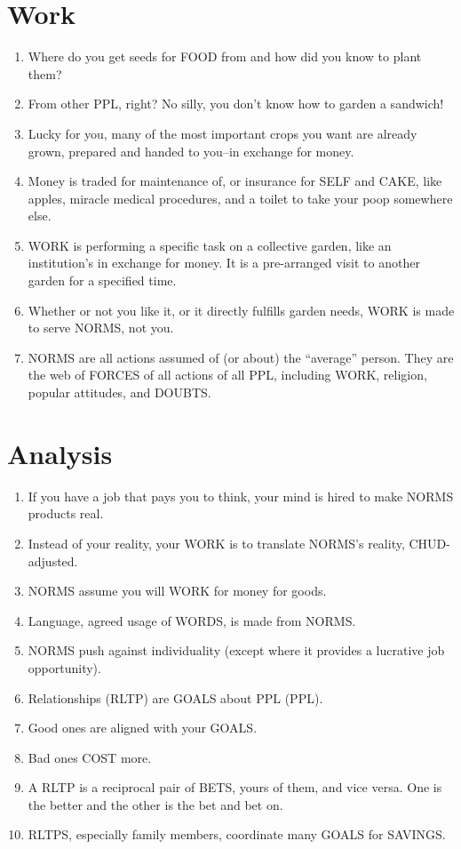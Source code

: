 \documentclass[
]{book}
\begin{document}
\hypertarget{work}{%
\section{Work}\label{work}}

\begin{enumerate}
\def\labelenumi{\arabic{enumi}.}
\setcounter{enumi}{9}
\item
  Where do you get seeds for FOOD from and how did you know to plant them?
\item
  From other PPL, right? No silly, you don't know how to garden a sandwich!
\item
  Lucky for you, many of the most important crops you want are already grown, prepared and handed to you--in exchange for money.
\item
  Money is traded for maintenance of, or insurance for SELF and CAKE, like apples, miracle medical procedures, and a toilet to take your poop somewhere else.
\item
  WORK is performing a specific task on a collective garden, like an institution's in exchange for money. It is a pre-arranged visit to another garden for a specified time.
\item
  Whether or not you like it, or it directly fulfills garden needs, WORK is made to serve NORMS, not you.
\item
  NORMS are all actions assumed of (or about) the ``average'' person. They are the web of FORCES of all actions of all PPL, including WORK, religion, popular attitudes, and DOUBTS.
\end{enumerate}

\hypertarget{analysis}{%
\section{Analysis}\label{analysis}}

\begin{enumerate}
\def\labelenumi{\arabic{enumi}.}
\setcounter{enumi}{16}
\item
  If you have a job that pays you to think, your mind is hired to make NORMS products real.
\item
  Instead of your reality, your WORK is to translate NORMS's reality, CHUD-adjusted.
\item
  NORMS assume you will WORK for money for goods.
\item
  Language, agreed usage of WORDS, is made from NORMS.
\item
  NORMS push against individuality (except where it provides a lucrative job opportunity).
\item
  Relationships (RLTP) are GOALS about PPL (PPL).
\item
  Good ones are aligned with your GOALS.
\item
  Bad ones COST more.
\item
  A RLTP is a reciprocal pair of BETS, yours of them, and vice versa. One is the better and the other is the bet and bet on.
\item
  RLTPS, especially family members, coordinate many GOALS for SAVINGS.
\end{enumerate}
\end{document}
